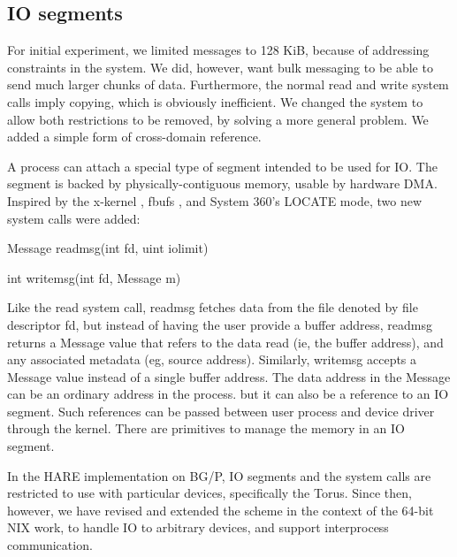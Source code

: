 \subsection{IO segments}

For initial experiment, we limited messages to 128 KiB, because of
addressing constraints in the system. We did, however, want bulk
messaging to be able to send much larger chunks of data.  Furthermore,
the normal read and write system calls imply copying, which is
obviously inefficient.  We changed the system to allow both
restrictions to be removed, by solving a more general problem. We
added a simple form of cross-domain reference.

A process can attach a special type of segment intended to be used for
IO.  The segment is backed by physically-contiguous memory, usable by
hardware DMA.  Inspired by the x-kernel \cite{hutchinson1991x}, fbufs
\cite{fbufs}, and System 360's LOCATE mode, two new system calls were
added:


\begin{center}
      Message readmsg(int fd, uint iolimit)

      int writemsg(int fd, Message m)
\end{center}

Like the read system call, readmsg fetches data from the file denoted by file descriptor fd,
but instead of having the user provide a buffer address, readmsg returns a Message value
that refers to the data read (ie, the buffer address), and any associated metadata (eg, source address). Similarly, writemsg accepts a Message value instead of a single buffer address.
The data address in the Message can be an ordinary address in the process.
but it can also be a reference to an IO segment.
Such references can be passed between user process and device driver through the kernel.
There are primitives to manage the memory in an IO segment.

In the HARE implementation on BG/P, IO segments and the system calls are restricted to use with particular devices, specifically the Torus.
Since then, however, we have revised and extended the scheme in the context of the 64-bit NIX work,
to handle IO to arbitrary devices, and support interprocess communication.
